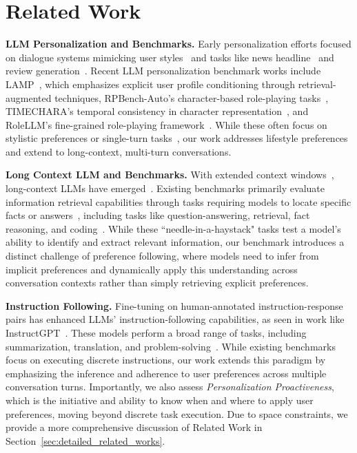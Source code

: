 
\section{Related Work}
\textbf{LLM Personalization and Benchmarks.} Early personalization efforts focused on dialogue systems mimicking user styles~\citep{zhang-etal-2018-personalizing, mazare-etal-2018-training, wu-etal-2021-personalized, zhong-etal-2022-less} and tasks like news headline~\citep{ao-etal-2021-pens} and review generation~\citep{li2019towards}. Recent LLM personalization benchmark works include LAMP~\citep{salemi2023lamp}, which emphasizes explicit user profile conditioning through retrieval-augmented techniques, RPBench-Auto's character-based role-playing tasks~\citep{rpbench2024}, TIMECHARA's temporal consistency in character representation~\citep{ahn2024timechara}, and RoleLLM's fine-grained role-playing framework~\citep{wang-etal-2024-rolellm}. While these often focus on stylistic preferences or single-turn tasks~\citep{lee2024aligning, li2024dissecting, jang2023personalized, zhao2023group}, our work addresses lifestyle preferences and extend to long-context, multi-turn conversations. 


\textbf{Long Context LLM and Benchmarks.} With extended context windows~\citep{reid2024gemini}, long-context LLMs have emerged~\citep{agarwal2024many, bertsch2024context}. Existing benchmarks primarily evaluate information retrieval capabilities through tasks requiring models to locate specific facts or answers~\citep{zhang2024infty, wang2024novelqa, an2023eval, li2023loogle}, including tasks like question-answering, retrieval, fact reasoning, and coding~\citep{an2023eval, bai2023longbench, kovcisky2018narrativeqa, dasigi2021dataset, huang2021efficient, li2024longcontext, kuratov2024babilong}. While these ``needle-in-a-haystack" tasks test a model's ability to identify and extract relevant information, our benchmark introduces a distinct challenge of preference following, where models need to infer from implicit preferences and dynamically apply this understanding across conversation contexts rather than simply retrieving explicit preferences.


\textbf{Instruction Following.} Fine-tuning on human-annotated instruction-response pairs has enhanced LLMs' instruction-following capabilities, as seen in work like InstructGPT~\citep{ouyang2022training}. These models perform a broad range of tasks, including summarization, translation, and problem-solving~\citep{zhong2024law, zhou2023instruction}. While existing benchmarks focus on executing discrete instructions, our work extends this paradigm by emphasizing the inference and adherence to user preferences across multiple conversation turns. Importantly, we also assess \textit{Personalization Proactiveness}, which is the initiative and ability to know when and where to apply user preferences, moving beyond discrete task execution. Due to space constraints, we provide a more comprehensive discussion of Related Work in Section~\ref{sec:detailed_related_works}.

